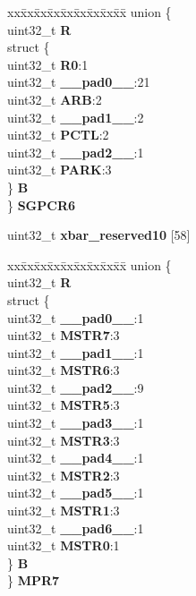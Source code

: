 \begin{DoxyCompactItemize}
\begin{tabbing}
\end{tabbing}\item 
\mbox{\label{structXBAR__tag_aa02fd31713fc36f8053c5763de477764}} 
\begin{tabbing}
xx\=xx\=xx\=xx\=xx\=xx\=xx\=xx\=xx\=\kill
union \{\\
\>uint32\_t {\bfseries R}\\
\>struct \{\\
\>\>uint32\_t {\bfseries R0}:1\\
\>\>uint32\_t {\bfseries \_\_pad0\_\_}:21\\
\>\>uint32\_t {\bfseries ARB}:2\\
\>\>uint32\_t {\bfseries \_\_pad1\_\_}:2\\
\>\>uint32\_t {\bfseries PCTL}:2\\
\>\>uint32\_t {\bfseries \_\_pad2\_\_}:1\\
\>\>uint32\_t {\bfseries PARK}:3\\
\>\} {\bfseries B}\\
\} {\bfseries SGPCR6}\\

\end{tabbing}\item 
\mbox{\label{structXBAR__tag_ae7d83296c5d445dc4d073a6f9a7957ed}} 
uint32\+\_\+t {\bfseries xbar\+\_\+reserved10} \mbox{[}58\mbox{]}
\item 
\mbox{\label{structXBAR__tag_a5d63ced8e333649585f47623ae7bb167}} 
\begin{tabbing}
xx\=xx\=xx\=xx\=xx\=xx\=xx\=xx\=xx\=\kill
union \{\\
\>uint32\_t {\bfseries R}\\
\>struct \{\\
\>\>uint32\_t {\bfseries \_\_pad0\_\_}:1\\
\>\>uint32\_t {\bfseries MSTR7}:3\\
\>\>uint32\_t {\bfseries \_\_pad1\_\_}:1\\
\>\>uint32\_t {\bfseries MSTR6}:3\\
\>\>uint32\_t {\bfseries \_\_pad2\_\_}:9\\
\>\>uint32\_t {\bfseries MSTR5}:3\\
\>\>uint32\_t {\bfseries \_\_pad3\_\_}:1\\
\>\>uint32\_t {\bfseries MSTR3}:3\\
\>\>uint32\_t {\bfseries \_\_pad4\_\_}:1\\
\>\>uint32\_t {\bfseries MSTR2}:3\\
\>\>uint32\_t {\bfseries \_\_pad5\_\_}:1\\
\>\>uint32\_t {\bfseries MSTR1}:3\\
\>\>uint32\_t {\bfseries \_\_pad6\_\_}:1\\
\>\>uint32\_t {\bfseries MSTR0}:1\\
\>\} {\bfseries B}\\
\} {\bfseries MPR7}\\


\end{tabbing}
\end{DoxyCompactItemize}
